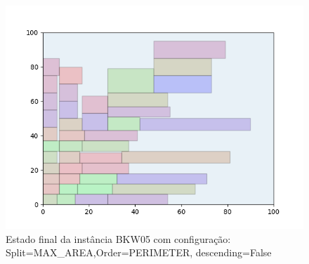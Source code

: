 \begin{figure}[H]
    \centering
    \caption[]{Estado final da instância BKW05 com configuração: Split=MAX_AREA,Order=PERIMETER, descending=False}
    \label{fig:bkw05-max_area-perimeter-false}
    \includegraphics[scale=0.5]{output/figures/bkw/bkw05/max_area/perimeter/false/00}
\end{figure}